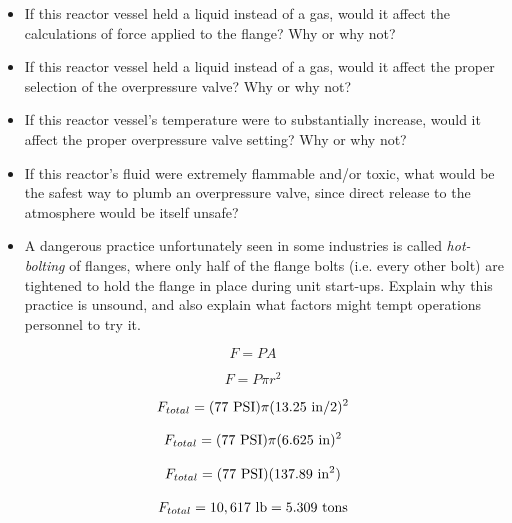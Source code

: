 \begin{itemize}
\item{} If this reactor vessel held a liquid instead of a gas, would it affect the calculations of force applied to the flange?  Why or why not?
\item{} If this reactor vessel held a liquid instead of a gas, would it affect the proper selection of the overpressure valve?  Why or why not?
\item{} If this reactor vessel's temperature were to substantially increase, would it affect the proper overpressure valve setting?  Why or why not?
\item{} If this reactor's fluid were extremely flammable and/or toxic, what would be the safest way to plumb an overpressure valve, since direct release to the atmosphere would be itself unsafe?
\item{} A dangerous practice unfortunately seen in some industries is called {\it hot-bolting} of flanges, where only half of the flange bolts (i.e. every other bolt) are tightened to hold the flange in place during unit start-ups.  Explain why this practice is unsound, and also explain what factors might tempt operations personnel to try it.
\end{itemize}














$$F = PA$$

$$F = P \pi r^2$$

$$F_{total} = (77 \hbox{ PSI}) \pi (13.25 \hbox{ in} / 2)^2$$

$$F_{total} = (77 \hbox{ PSI}) \pi (6.625 \hbox{ in})^2$$

$$F_{total} = (77 \hbox{ PSI}) (137.89 \hbox{ in}^2)$$

$$F_{total} = 10,617 \hbox{ lb} = 5.309 \hbox{ tons}$$




